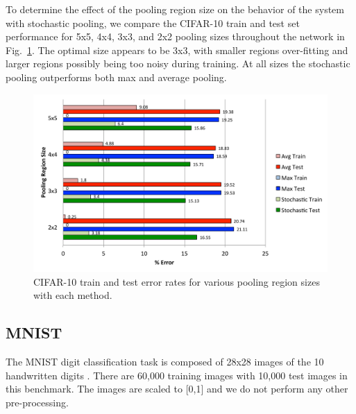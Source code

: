 \documentclass{article} %
\newcommand{\fig}[1]{Fig.~\ref{fig:#1}}
\begin{document}
To determine the effect of the pooling region size on the behavior of
the system with stochastic pooling, we compare the CIFAR-10 train
and test set performance for 5x5, 4x4, 3x3, and 2x2 pooling sizes
throughout the network in \fig{cifar_ps}. The optimal size appears to
be 3x3, with smaller regions over-fitting and larger regions possibly
being too noisy during training. At all sizes the stochastic pooling
outperforms both max and average pooling.


\begin{figure}[h!]
\begin{center}
\includegraphics[width=4.8in]{psizes.pdf}
\end{center}
\vspace*{-0.8cm}
\caption{CIFAR-10 train and test error rates for various pooling region sizes with each method.}
\label{fig:cifar_ps}
\vspace*{-0.5cm}
\end{figure}



\subsection{MNIST}

The MNIST digit classification task is composed of 28x28 images of the
10 handwritten digits \cite{MNIST}. There are 60,000 training images with 10,000
test images in this benchmark. The images are scaled to [0,1] and we do not perform any other
pre-processing.

\end{document}
